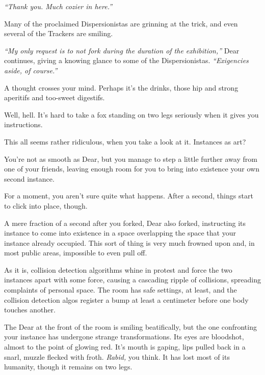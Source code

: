 \emph{``Thank you. Much cozier in here.''}

Many of the proclaimed Dispersionistas are grinning at the trick, and even several of the Trackers are smiling.

\emph{``My only request is to not fork during the duration of the exhibition,''} Dear continues, giving a knowing glance to some of the Dispersionistas. \emph{``Exigencies aside, of course.''}

A thought crosses your mind. Perhaps it's the drinks, those hip and strong aperitifs and too-sweet digestifs.

\vfill

\newpage

\null
\vfill

\noindent Well, hell. It's hard to take a fox standing on two legs seriously when it gives you instructions.

\vfill

\newpage
\null
\vfill

\noindent This all seems rather ridiculous, when you take a look at it. Instances as art?
\null
\vfill

\newpage
\null
\vfill

\noindent You're not as smooth as Dear, but you manage to step a little further away from one of your friends, leaving enough room for you to bring into existence your own second instance.
\null
\vfill

\newpage
\null
\vfill

\noindent For a moment, you aren't sure quite what happens. After a second, things start to click into place, though.

A mere fraction of a second after you forked, Dear also forked, instructing its instance to come into existence in a space overlapping the space that your instance already occupied. This sort of thing is very much frowned upon and, in most public areas, impossible to even pull off.

As it is, collision detection algorithms whine in protest and force the two instances apart with some force, causing a cascading ripple of collisions, spreading complaints of personal space. The room has safe settings, at least, and the collision detection algos register a bump at least a centimeter before one body touches another.

The Dear at the front of the room is smiling beatifically, but the one confronting your instance has undergone strange transformations. Its eyes are bloodshot, almost to the point of glowing red. It's mouth is gaping, lips pulled back in a snarl, muzzle flecked with froth. \emph{Rabid,} you think. It has lost most of its humanity, though it remains on two legs.

